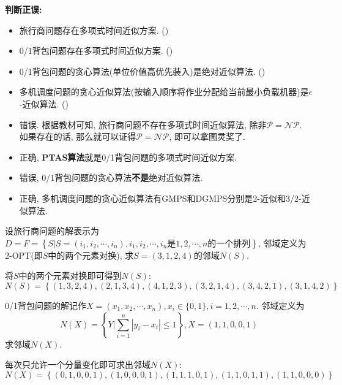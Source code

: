 \documentclass{article}
\begin{document}
\begin{homeworkProblem}
	\textbf{判断正误:}
	\begin{itemize}
		\item 旅行商问题存在多项式时间近似方案. (\quad)
		\item 0/1背包问题存在多项式时间近似方案. (\quad)
		\item 0/1背包问题的贪心算法(单位价值高优先装入)是绝对近似算法. (\quad)
		\item 多机调度问题的贪心近似算法(按输入顺序将作业分配给当前最小负载机器)是$\epsilon$-近似算法. (\quad)
	\end{itemize}
	\solution
	\begin{itemize}
		\item 错误. 根据教材可知, 旅行商问题不存在多项式时间近似算法, 除非$\mathcal{P}=\mathcal{NP}$. 如果存在的话, 那么就可以证得$\mathcal{P}=\mathcal{NP}$, 即可以拿图灵奖了.
		\item 正确, \textbf{PTAS算法}就是0/1背包问题的多项式时间近似方案.
		\item 错误, 0/1背包问题的贪心算法\textbf{不是}绝对近似算法.
		\item 正确, 多机调度问题的贪心近似算法有GMPS和DGMPS分别是2-近似和3/2-近似算法.
	\end{itemize}
\end{homeworkProblem}

\pagebreak



\begin{homeworkProblem}
    设旅行商问题的解表示为$D=F=\left\{ S|S=\left( i_1,i_2,\cdots ,i_n \right) ,i_1,i_2,\cdots ,i_n\text{是}1,2,\cdots ,n\text{的一个排列} \right\}$, 邻域定义为2-OPT(即$S$中的两个元素对换), 求$S=(3,1,2,4)$的邻域$N(S)$.

    \solution 将$S$中的两个元素对换即可得到$N(S)$:
    $$
    N\left( S \right) =\left\{ \left( 1,3,2,4 \right) ,\left( 2,1,3,4 \right) ,\left( 4,1,2,3 \right) ,\left( 3,2,1,4 \right) ,\left( 3,4,2,1 \right) ,\left( 3,1,4,2 \right) \right\} 
    $$
\end{homeworkProblem}

\begin{homeworkProblem}
    0/1背包问题的解记作$X=(x_1,x_2,\cdots,x_n),x_i\in \{0,1\},i=1,2,\cdots,n$. 邻域定义为$$\displaystyle N\left( X \right) =\left\{ Y \Bigg |\sum_{i=1}^n{\left| y_i-x_i \right|}\le 1 \right\},X=(1,1,0,0,1)$$
    求邻域$N(X)$.

    \solution 每次只允许一个分量变化即可求出邻域$N(X)$:
    $$
    N\left( X \right) =\left\{ \left( 0,1,0,0,1 \right) ,\left( 1,0,0,0,1 \right) ,\left( 1,1,1,0,1 \right) ,\left( 1,1,0,1,1 \right) ,\left( 1,1,0,0,0 \right) \right\} 
    $$
\end{homeworkProblem}
\end{document}
